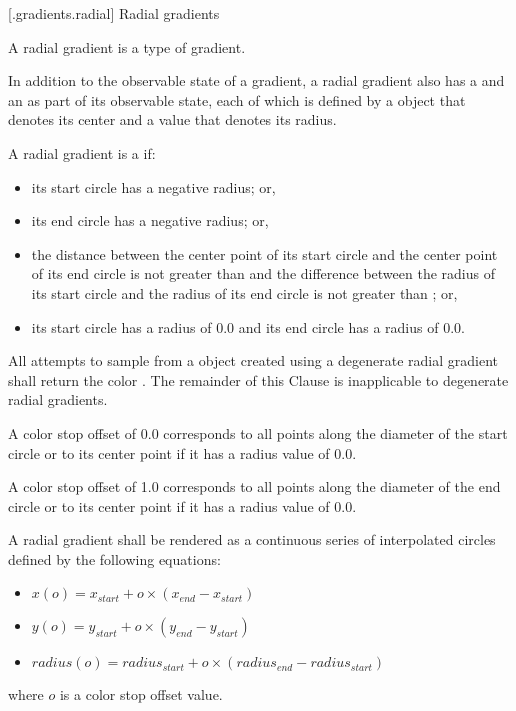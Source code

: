  [\iotwod.gradients.radial] {Radial gradients}

\pnum
A radial gradient is a type of gradient.

\pnum
In addition to the observable state of a gradient, a radial gradient also has a  and an  as part of its observable state, each of which is defined by a  object that denotes its center and a  value that denotes its radius.

\pnum
A radial gradient is a  if:
\begin{itemize}
\item its start circle has a negative radius; or,
\item its end circle has a negative radius; or,
\item the distance between the center point of its start circle and the center point of its end circle is not greater than  and the difference between the radius of its start circle and the radius of its end circle is not greater than ; or,
\item its start circle has a radius of 0.0 and its end circle has a radius of 0.0.
\end{itemize}

\pnum
All attempts to sample from a  object created using a degenerate radial gradient shall return the color . The remainder of this Clause is inapplicable to degenerate radial gradients.

\pnum
A color stop offset of 0.0 corresponds to all points along the diameter of the start circle or to its center point if it has a radius value of 0.0.

\pnum
A color stop offset of 1.0 corresponds to all points along the diameter of the end circle or to its center point if it has a radius value of 0.0.

\pnum
A radial gradient shall be rendered as a continuous series of interpolated circles defined by the following equations:
\begin{itemize}
\item $x(o) = x_{start} + o \times (x_{end} - x_{start})$
\item $y(o) = y_{start} + o \times (y_{end} - y_{start})$
\item $radius(o) = radius_{start} + o \times (radius_{end} - radius_{start})$
\end{itemize}
where $o$ is a color stop offset value.

